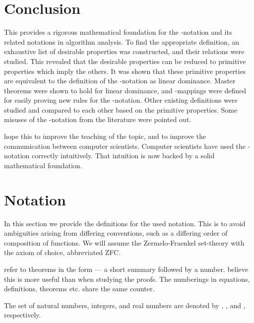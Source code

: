 \documentclass[b5paper, english, oneside]{memoir}
\begin{document}
\chapter{Conclusion}
\label{Conclusion}

This \manuscript{} provides a rigorous mathematical foundation for the -notation and its related notations in algorithm analysis. To find the appropriate definition, an exhaustive list of desirable properties was constructed, and their relations were studied. This revealed that the desirable properties can be reduced to \nprim{} primitive properties which imply the others. It was shown that these primitive properties are equivalent to the definition of the -notation as linear dominance. Master theorems were shown to hold for linear dominance, and -mappings were defined for easily proving new rules for the -notation. Other existing definitions were studied and compared to each other based on the primitive properties. Some misuses of the -notation from the literature were pointed out.

\We{} hope this \manuscript{} to improve the teaching of the topic, and to improve the communication between computer scientists. Computer scientists have used the -notation correctly intuitively. That intuition is now backed by a solid mathematical foundation.

\ifarxiv


\else
\printbibliography
\fi

\appendix

\chapter{Notation}
\label{Notation}

In this section we provide the definitions for the used notation. This is to avoid ambiguities arising from differing conventions, such as a differing order of composition of functions. We will assume the Zermelo-Fraenkel set-theory with the axiom of choice, abbreviated ZFC.  

\We{} refer to theorems in the form  --- a short summary followed by a number. \We{} believe this is more useful than  when studying the proofs. The numberings in equations, definitions, theorems etc. share the same counter.

\begin{definition}[Numbers]
The set of natural numbers, integers, and real numbers are denoted by , , and , respectively. 
\end{definition}
\end{document}
